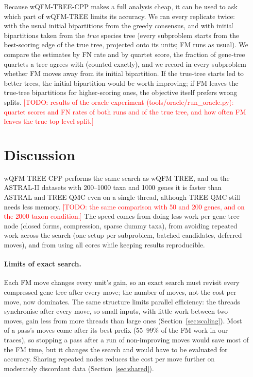 \documentclass[11pt,a4paper]{article}
\newcommand{\todo}[1]{\textcolor{red}{[TODO: #1]}}
\newcommand{\wqfmtree}{wQFM-TREE}
\newcommand{\cpp}{wQFM-TREE-CPP}
\begin{document}
Because \cpp{} makes a full analysis cheap, it can be used to ask which part of \wqfmtree{} limits
its accuracy. We ran every replicate twice: with the usual initial bipartitions from the greedy
consensus, and with initial bipartitions taken from the \emph{true} species tree (every subproblem
starts from the best-scoring edge of the true tree, projected onto its units; FM runs as usual). We
compare the estimates by FN rate and by quartet score, the fraction of gene-tree quartets a tree
agrees with (counted exactly), and we record in every subproblem whether FM moves away from its
initial bipartition. If the true-tree starts led to better trees, the initial bipartition would be
worth improving; if FM leaves the true-tree bipartitions for higher-scoring ones, the objective
itself prefers wrong splits. \todo{results of the oracle experiment (tools/oracle/run\_oracle.py):
quartet scores and FN rates of both runs and of the true tree, and how often FM leaves the true
top-level split.}

\section{Discussion}\label{sec:discussion}

\cpp{} performs the same search as \wqfmtree{}, and on the ASTRAL-II datasets with 200--1000 taxa and
1000 genes it is faster than ASTRAL and TREE-QMC even on a single thread, although TREE-QMC still
needs less memory. \todo{the same comparison with 50 and 200 genes, and on the 2000-taxon condition.}
The speed comes from doing less work per gene-tree node (closed forms, compression, sparse dummy
taxa), from avoiding repeated work across the search (one setup per subproblem, batched candidates,
deferred moves), and from using all cores while keeping results reproducible.

\paragraph{Limits of exact search.} Each FM move changes every unit's gain, so an exact search must
revisit every compressed gene tree after every move; the number of moves, not the cost per move, now
dominates. The same structure limits parallel efficiency: the threads synchronise after every move, so
small inputs, with little work between two moves, gain less from more threads than large ones
(Section~\ref{sec:scaling}). Most of a pass's moves come after its best prefix (55--99\% of the FM work in our traces),
so stopping a pass after a run of non-improving moves would save most of the FM time, but it changes
the search and would have to be evaluated for accuracy. Sharing repeated nodes reduces the cost per
move further on moderately discordant data (Section~\ref{sec:shared}).
\end{document}

